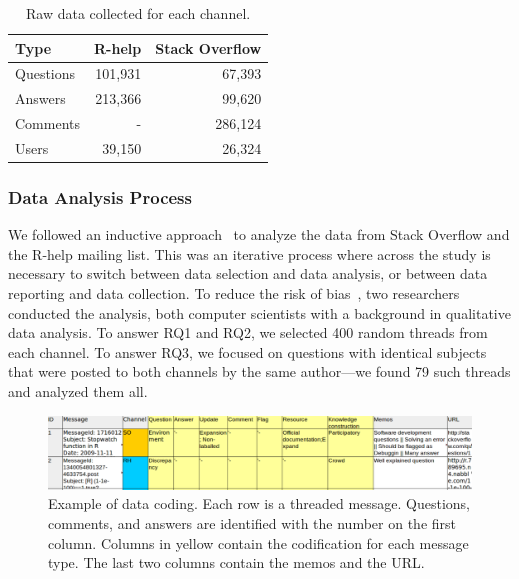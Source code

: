 	\begin{table}[!htb]
	  \centering
      \caption{Raw data collected for each channel.}
      \begin{small}
        \begin{tabular}{lrr}
	        \toprule
	        Type          &  R-help & Stack Overflow \\
	        \midrule
	        Questions     & 101,931 &  67,393 \\
	        Answers       & 213,366 &  99,620 \\
	        Comments      &       - & 286,124 \\
	        Users         &  39,150 &  26,324 \\
	        \bottomrule
        \end{tabular}
      \end{small}
	  \label{table:data}
	\end{table}





\subsubsection{Data Analysis Process}
\label{sec:dap}

We followed an inductive approach~\cite{Runeson2012} to analyze the data from Stack Overflow and the R-help mailing list. This was an iterative process where  across the study is necessary to switch between data selection and data analysis, or between data reporting and data collection. To reduce the risk of bias~\cite{Runeson2012}, two researchers conducted the analysis, both computer scientists with a background in qualitative data analysis. To answer RQ1 and RQ2, we selected 400 random threads from each channel. To answer RQ3, we focused on questions with identical subjects that were posted to both channels by the same author---we found 79 such threads and analyzed them all.
    
    \begin{figure}[htbp]
    	\centering
    	\includegraphics[width=.95\textwidth]{Figures/CodingExample}
    	\caption{Example of data coding. Each row is a threaded message. Questions, comments, and answers are identified with the number on the first column. Columns in yellow contain the codification for each message type. The last two columns contain the memos and the URL.}
    	\label{fig:CodingExample}
    \end{figure}

